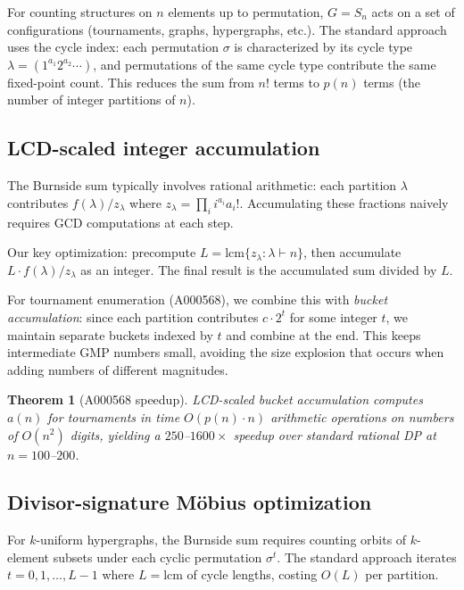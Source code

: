 \documentclass[12pt,reqno]{amsart}
\theoremstyle{plain}
\newtheorem{theorem}{Theorem}[section]
\theoremstyle{definition}
\theoremstyle{remark}
\begin{document}
For counting structures on $n$ elements up to permutation, $G = S_n$ acts on
a set of configurations (tournaments, graphs, hypergraphs, etc.). The standard
approach uses the cycle index: each permutation $\sigma$ is characterized by
its cycle type $\lambda = (1^{a_1} 2^{a_2} \cdots)$, and permutations of the
same cycle type contribute the same fixed-point count. This reduces the sum
from $n!$ terms to $p(n)$ terms (the number of integer partitions of $n$).

\subsection{LCD-scaled integer accumulation}

The Burnside sum typically involves rational arithmetic: each partition $\lambda$
contributes $f(\lambda) / z_\lambda$ where $z_\lambda = \prod_i i^{a_i} a_i!$.
Accumulating these fractions naively requires GCD computations at each step.

Our key optimization: precompute $L = \text{lcm}\{z_\lambda : \lambda \vdash n\}$,
then accumulate $L \cdot f(\lambda) / z_\lambda$ as an integer. The final result
is the accumulated sum divided by $L$.

For tournament enumeration (A000568), we combine this with \emph{bucket
accumulation}: since each partition contributes $c \cdot 2^t$ for some integer $t$,
we maintain separate buckets indexed by $t$ and combine at the end. This keeps
intermediate GMP numbers small, avoiding the size explosion that occurs when
adding numbers of different magnitudes.

\begin{theorem}[A000568 speedup]
LCD-scaled bucket accumulation computes $a(n)$ for tournaments in time
$O(p(n) \cdot n)$ arithmetic operations on numbers of $O(n^2)$ digits, yielding
a $250$--$1600\times$ speedup over standard rational DP at $n = 100$--$200$.
\end{theorem}

\subsection{Divisor-signature M\"obius optimization}

For $k$-uniform hypergraphs, the Burnside sum requires counting orbits of
$k$-element subsets under each cyclic permutation $\sigma^t$. The standard
approach iterates $t = 0, 1, \ldots, L-1$ where $L = \text{lcm}$ of cycle
lengths, costing $O(L)$ per partition.
\end{document}
